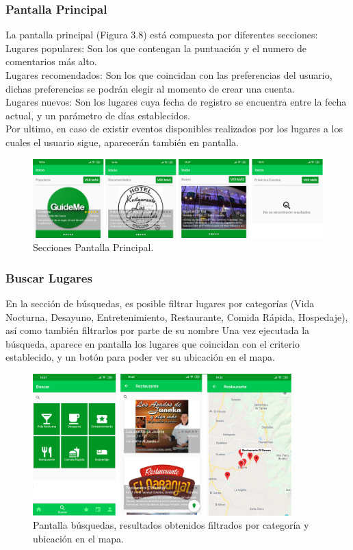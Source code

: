 \documentclass[12pt,letterpaper,openany]{book}
\begin{document}
\subsubsection{Pantalla Principal}
La pantalla principal (Figura 3.8) está compuesta por diferentes secciones: \\
Lugares populares: Son los que contengan la puntuación y el numero de comentarios más alto.\\
Lugares recomendados: Son los que coincidan con las preferencias del usuario, dichas preferencias se podrán elegir al momento de crear una cuenta.\\
Lugares nuevos: Son los lugares cuya fecha de registro se encuentra entre la fecha actual, y un parámetro de días establecidos.\\
Por ultimo, en caso de existir eventos disponibles realizados por los lugares a los cuales el usuario sigue, aparecerán también  en pantalla.
\begin{figure}[H]
\begin{center}
\includegraphics[width=14cm]{./imagenes/1}
\caption{Secciones Pantalla Principal.}
\end{center}
\end{figure}

\subsubsection{Buscar Lugares}
En la sección de búsquedas, es posible filtrar lugares por categorías (Vida Nocturna, Desayuno, Entretenimiento, Restaurante, Comida Rápida, Hospedaje), así como también filtrarlos por parte de su nombre
\vspace{5mm}\newline
Una vez ejecutada la búsqueda, aparece en pantalla los lugares que coincidan con el criterio establecido, y un botón para poder ver su ubicación en el mapa.
\begin{figure}[H]
\begin{center}
\includegraphics[width=10cm]{./imagenes/2}
\caption{Pantalla búsquedas, resultados obtenidos filtrados por categoría y ubicación en el mapa.}
\end{center}
\end{figure}
\end{document}
